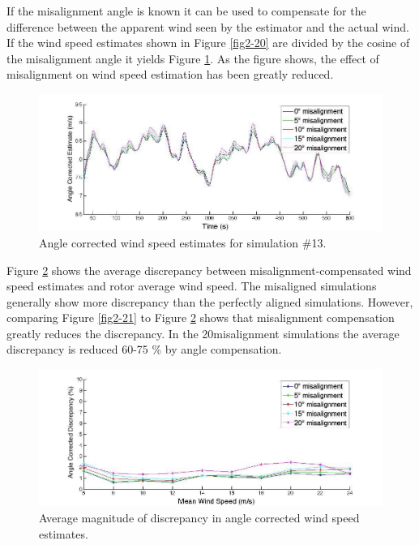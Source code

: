 If the misalignment angle is known it can be used to compensate for the difference between the apparent wind seen by the estimator and the actual wind. If the wind speed estimates shown in Figure \ref{fig2-20} are divided by the cosine of the misalignment angle it yields Figure \ref{fig2-23}. As the figure shows, the effect of misalignment on wind speed estimation has been greatly reduced. 


\begin{figure}[htbp]
	\centering
	\includegraphics[width = \linewidth]{Figures/ch2Figures/fig2-23.jpg}
		
	\caption{Angle corrected wind speed estimates for simulation \#13.}
	\label{fig2-23}
\end{figure}


Figure \ref{fig2-24} shows the average discrepancy between misalignment-compensated wind speed estimates and rotor average wind speed. The misaligned simulations generally show more discrepancy than the perfectly aligned simulations. However, comparing Figure \ref{fig2-21} to Figure \ref{fig2-24} shows that misalignment compensation greatly reduces the discrepancy. In the 20\degree misalignment simulations the average discrepancy is reduced 60-75 \% by angle compensation.


\begin{figure}[htbp]
	\centering
		\includegraphics[width = \linewidth]{Figures/ch2Figures/fig2-24.jpg}
		
	\caption{Average magnitude of discrepancy in angle corrected wind speed estimates.}
	\label{fig2-24}
\end{figure}


